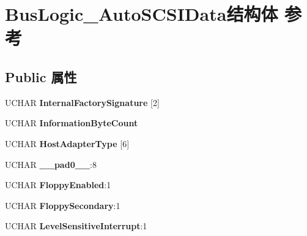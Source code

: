 \hypertarget{struct_bus_logic___auto_s_c_s_i_data}{}\section{Bus\+Logic\+\_\+\+Auto\+S\+C\+S\+I\+Data结构体 参考}
\label{struct_bus_logic___auto_s_c_s_i_data}
\subsection*{Public 属性}
\begin{DoxyCompactItemize}
\item 
\mbox{\label{struct_bus_logic___auto_s_c_s_i_data_afbccbe3d4f0f533daaa3c5c58bf4e9f4}} 
U\+C\+H\+AR {\bfseries Internal\+Factory\+Signature} \mbox{[}2\mbox{]}
\item 
\mbox{\label{struct_bus_logic___auto_s_c_s_i_data_af4d9948c15e384938d31a8838332defe}} 
U\+C\+H\+AR {\bfseries Information\+Byte\+Count}
\item 
\mbox{\label{struct_bus_logic___auto_s_c_s_i_data_ac15c78eed6bfa065ed08251ecb64f888}} 
U\+C\+H\+AR {\bfseries Host\+Adapter\+Type} \mbox{[}6\mbox{]}
\item 
\mbox{\label{struct_bus_logic___auto_s_c_s_i_data_ab7fd04fce5957966c4abbeb7c6ed57d1}} 
U\+C\+H\+AR {\bfseries \+\_\+\+\_\+pad0\+\_\+\+\_\+}\+:8
\item 
\mbox{\label{struct_bus_logic___auto_s_c_s_i_data_a614cd8fac551ce7d809424232435fa1a}} 
U\+C\+H\+AR {\bfseries Floppy\+Enabled}\+:1
\item 
\mbox{\label{struct_bus_logic___auto_s_c_s_i_data_afcbc0f51396858b787a403130e98e288}} 
U\+C\+H\+AR {\bfseries Floppy\+Secondary}\+:1
\item 
\mbox{\label{struct_bus_logic___auto_s_c_s_i_data_a13a599fc08946cfa18b34ce392dec937}} 
U\+C\+H\+AR {\bfseries Level\+Sensitive\+Interrupt}\+:1
\item 

\end{DoxyCompactItemize}
